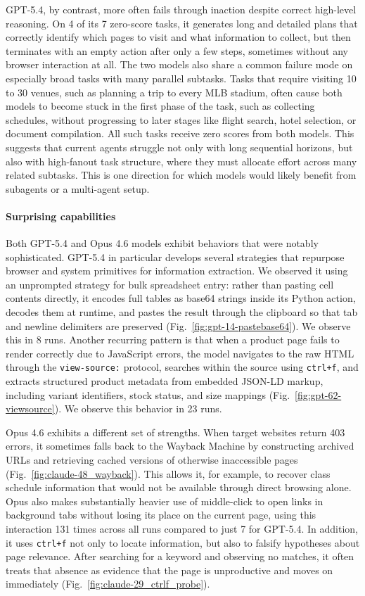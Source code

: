 \documentclass{article}
\theoremstyle{plain}
\theoremstyle{definition}
\theoremstyle{remark}
\begin{document}
GPT-5.4, by contrast, more often fails through inaction despite correct high-level reasoning. On 4 of its 7 zero-score tasks, it generates long and detailed plans that correctly identify which pages to visit and what information to collect, but then terminates with an empty action after only a few steps, sometimes without any browser interaction at all.
The two models also share a common failure mode on especially broad tasks with many parallel subtasks. Tasks that require visiting 10 to 30 venues, such as planning a trip to every MLB stadium, often cause both models to become stuck in the first phase of the task, such as collecting schedules, without progressing to later stages like flight search, hotel selection, or document compilation. All such tasks receive zero scores from both models. This suggests that current agents struggle not only with long sequential horizons, but also with high-fanout task structure, where they must allocate effort across many related subtasks. This is one direction for which models would likely benefit from subagents or a multi-agent setup.

\paragraph{Surprising capabilities}
Both GPT-5.4 and Opus 4.6 models exhibit behaviors that were notably sophisticated. GPT-5.4 in particular develops several strategies that repurpose browser and system primitives for information extraction. We observed it using an unprompted strategy for bulk spreadsheet entry: rather than pasting cell contents directly, it encodes full tables as base64 strings inside its Python action, decodes them at runtime, and pastes the result through the clipboard so that tab and newline delimiters are preserved (Fig.~\ref{fig:gpt-14-pastebase64}). We observe this in 8 runs. Another recurring pattern is that when a product page fails to render correctly due to JavaScript errors, the model navigates to the raw HTML through the \texttt{view-source:} protocol, searches within the source using \texttt{ctrl+f}, and extracts structured product metadata from embedded JSON-LD markup, including variant identifiers, stock status, and size mappings (Fig.~\ref{fig:gpt-62-viewsource}). We observe this behavior in 23 runs.

Opus 4.6 exhibits a different set of strengths. When target websites return 403 errors, it sometimes falls back to the Wayback Machine by constructing archived URLs and retrieving cached versions of otherwise inaccessible pages (Fig.~\ref{fig:claude-48_wayback}). This allows it, for example, to recover class schedule information that would not be available through direct browsing alone. Opus also makes substantially heavier use of middle-click to open links in background tabs without losing its place on the current page, using this interaction 131 times across all runs compared to just 7 for GPT-5.4. In addition, it uses \texttt{ctrl+f} not only to locate information, but also to falsify hypotheses about page relevance. After searching for a keyword and observing no matches, it often treats that absence as evidence that the page is unproductive and moves on immediately (Fig.~\ref{fig:claude-29_ctrlf_probe}).
\end{document}
